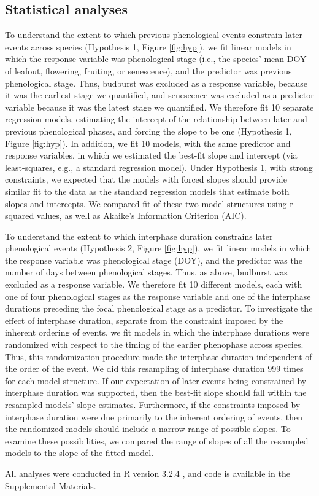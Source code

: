 \documentclass{article}
\begin{document}
\subsection*{Statistical analyses}
To understand the extent to which previous phenological events constrain later events across species (Hypothesis 1, Figure \ref{fig:hyp}), we fit linear models in which the response variable was phenological stage (i.e., the species' mean DOY of leafout, flowering, fruiting, or senescence), and the predictor was previous phenological stage. Thus, budburst was excluded as a response variable, because it was the earliest stage we quantified, and senescence was excluded as a predictor variable because it was the latest stage we quantified. We therefore fit 10 separate regression models, estimating the intercept of the relationship between later and previous phenological phases, and forcing the slope to be one (Hypothesis 1, Figure \ref{fig:hyp}). In addition, we fit 10 models, with the same predictor and response variables, in which we estimated the best-fit slope and intercept (via least-squares, e.g., a standard regression model). Under Hypothesis 1, with strong constraints, we expected that the models with forced slopes should provide similar fit to the data as the standard regression models that estimate both slopes and intercepts. We compared fit of these two model structures using r-squared values, as well as Akaike's Information Criterion (AIC). 
\par To understand the extent to which interphase duration constrains later phenological events (Hypothesis 2, Figure \ref{fig:hyp}), we fit linear models in which the response variable was phenological stage (DOY), and the predictor was the number of days between phenological stages. Thus, as above, budburst was excluded as a response variable. We therefore fit 10 different models, each with one of four phenological stages as the response variable and one of the interphase durations preceding the focal phenological stage as a predictor. To investigate the effect of interphase duration, separate from the constraint imposed by the inherent ordering of events, we fit models in which the interphase durations were randomized with respect to the timing of the earlier phenophase across species. Thus, this randomization procedure made the interphase duration independent of the order of the event. We did this resampling of interphase duration 999 times for each model structure. If our expectation of later events being constrained by interphase duration was supported, then the best-fit slope should fall within the resampled models' slope estimates. Furthermore, if the constraints imposed by interphase duration were due primarily to the inherent ordering of events, then the randomized models should include a narrow range of possible slopes. To examine these possibilities, we compared the range of slopes of all the resampled models to the slope of the fitted model. 
\par All analyses were conducted in R version 3.2.4 \citep{rcoreteam2017}, and code is available in the Supplemental Materials.
\end{document}
